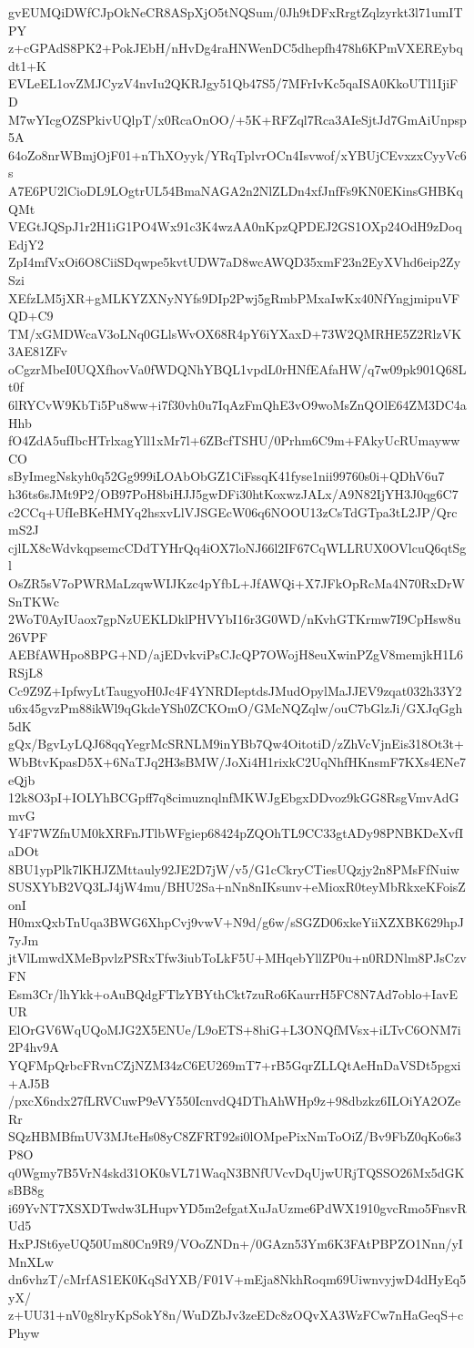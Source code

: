 gvEUMQiDWfCJpOkNeCR8ASpXjO5tNQSum/0Jh9tDFxRrgtZqlzyrkt3l71umITPY
z+cGPAdS8PK2+PokJEbH/nHvDg4raHNWenDC5dhepfh478h6KPmVXEREybqdt1+K
EVLeEL1ovZMJCyzV4nvIu2QKRJgy51Qb47S5/7MFrIvKc5qaISA0KkoUTl1IjiFD
M7wYIcgOZSPkivUQlpT/x0RcaOnOO/+5K+RFZql7Rca3AIeSjtJd7GmAiUnpsp5A
64oZo8nrWBmjOjF01+nThXOyyk/YRqTplvrOCn4Isvwof/xYBUjCEvxzxCyyVc6s
A7E6PU2lCioDL9LOgtrUL54BmaNAGA2n2NlZLDn4xfJnfFs9KN0EKinsGHBKqQMt
VEGtJQSpJ1r2H1iG1PO4Wx91c3K4wzAA0nKpzQPDEJ2GS1OXp24OdH9zDoqEdjY2
ZpI4mfVxOi6O8CiiSDqwpe5kvtUDW7aD8wcAWQD35xmF23n2EyXVhd6eip2ZySzi
XEfzLM5jXR+gMLKYZXNyNYfs9DIp2Pwj5gRmbPMxaIwKx40NfYngjmipuVFQD+C9
TM/xGMDWcaV3oLNq0GLlsWvOX68R4pY6iYXaxD+73W2QMRHE5Z2RlzVK3AE81ZFv
oCgzrMbeI0UQXfhovVa0fWDQNhYBQL1vpdL0rHNfEAfaHW/q7w09pk901Q68Lt0f
6lRYCvW9KbTi5Pu8ww+i7f30vh0u7IqAzFmQhE3vO9woMsZnQOlE64ZM3DC4aHhb
fO4ZdA5ufIbcHTrlxagYll1xMr7l+6ZBcfTSHU/0Prhm6C9m+FAkyUcRUmaywwCO
sByImegNskyh0q52Gg999iLOAbObGZ1CiFssqK41fyse1nii99760s0i+QDhV6u7
h36ts6sJMt9P2/OB97PoH8biHJJ5gwDFi30htKoxwzJALx/A9N82IjYH3J0qg6C7
c2CCq+UfIeBKeHMYq2hsxvLlVJSGEcW06q6NOOU13zCsTdGTpa3tL2JP/QrcmS2J
cjlLX8cWdvkqpsemcCDdTYHrQq4iOX7loNJ66l2IF67CqWLLRUX0OVlcuQ6qtSgl
OsZR5sV7oPWRMaLzqwWIJKzc4pYfbL+JfAWQi+X7JFkOpRcMa4N70RxDrWSnTKWc
2WoT0AyIUaox7gpNzUEKLDklPHVYbI16r3G0WD/nKvhGTKrmw7I9CpHsw8u26VPF
AEBfAWHpo8BPG+ND/ajEDvkviPsCJcQP7OWojH8euXwinPZgV8memjkH1L6RSjL8
Cc9Z9Z+IpfwyLtTaugyoH0Jc4F4YNRDIeptdsJMudOpylMaJJEV9zqat032h33Y2
u6x45gvzPm88ikWl9qGkdeYSh0ZCKOmO/GMcNQZqlw/ouC7bGlzJi/GXJqGgh5dK
gQx/BgvLyLQJ68qqYegrMcSRNLM9inYBb7Qw4OitotiD/zZhVcVjnEis318Ot3t+
WbBtvKpasD5X+6NaTJq2H3sBMW/JoXi4H1rixkC2UqNhfHKnsmF7KXs4ENe7eQjb
12k8O3pI+IOLYhBCGpff7q8cimuznqlnfMKWJgEbgxDDvoz9kGG8RsgVmvAdGmvG
Y4F7WZfnUM0kXRFnJTlbWFgiep68424pZQOhTL9CC33gtADy98PNBKDeXvfIaDOt
8BU1ypPlk7lKHJZMttauly92JE2D7jW/v5/G1cCkryCTiesUQzjy2n8PMsFfNuiw
SUSXYbB2VQ3LJ4jW4mu/BHU2Sa+nNn8nIKsunv+eMioxR0teyMbRkxeKFoisZonI
H0mxQxbTnUqa3BWG6XhpCvj9vwV+N9d/g6w/sSGZD06xkeYiiXZXBK629hpJ7yJm
jtVlLmwdXMeBpvlzPSRxTfw3iubToLkF5U+MHqebYllZP0u+n0RDNlm8PJsCzvFN
Esm3Cr/lhYkk+oAuBQdgFTlzYBYthCkt7zuRo6KaurrH5FC8N7Ad7oblo+IavEUR
ElOrGV6WqUQoMJG2X5ENUe/L9oETS+8hiG+L3ONQfMVsx+iLTvC6ONM7i2P4hv9A
YQFMpQrbcFRvnCZjNZM34zC6EU269mT7+rB5GqrZLLQtAeHnDaVSDt5pgxi+AJ5B
/pxcX6ndx27fLRVCuwP9eVY550IcnvdQ4DThAhWHp9z+98dbzkz6ILOiYA2OZeRr
SQzHBMBfmUV3MJteHs08yC8ZFRT92si0lOMpePixNmToOiZ/Bv9FbZ0qKo6s3P8O
q0Wgmy7B5VrN4skd31OK0sVL71WaqN3BNfUVcvDqUjwURjTQSSO26Mx5dGKsBB8g
i69YvNT7XSXDTwdw3LHupvYD5m2efgatXuJaUzme6PdWX1910gvcRmo5FnsvRUd5
HxPJSt6yeUQ50Um80Cn9R9/VOoZNDn+/0GAzn53Ym6K3FAtPBPZO1Nnn/yIMnXLw
dn6vhzT/cMrfAS1EK0KqSdYXB/F01V+mEja8NkhRoqm69UiwnvyjwD4dHyEq5yX/
z+UU31+nV0g8lryKpSokY8n/WuDZbJv3zeEDc8zOQvXA3WzFCw7nHaGeqS+cPhyw
